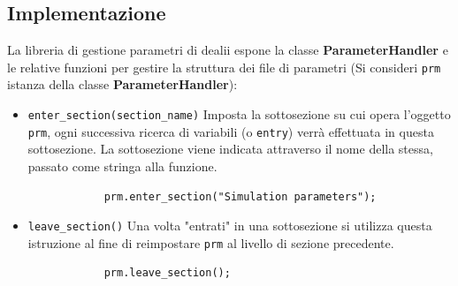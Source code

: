         \subsection{Implementazione}\label{implementazione_prm}
        La libreria di gestione parametri di dealii espone la classe \textbf{ParameterHandler} e
        le relative funzioni per gestire la struttura dei file di parametri (Si consideri \texttt{prm} istanza della classe \textbf{ParameterHandler}):
        \begin{itemize}
            \item \texttt{enter\_section(section\_name)}\newline
            Imposta la sottosezione su cui opera l'oggetto \texttt{prm}, ogni successiva ricerca di variabili (o \texttt{entry}) verrà effettuata
            in questa sottosezione. La sottosezione viene indicata attraverso il nome della stessa, passato come stringa alla funzione.
            \begin{verbatim}
            prm.enter_section("Simulation parameters");
            \end{verbatim}
            \item \texttt{leave\_section()}\newline
            Una volta "entrati" in una sottosezione si utilizza questa istruzione al fine di reimpostare \texttt{prm} al livello di sezione precedente.
            \begin{verbatim}
            prm.leave_section();
            \end{verbatim}


\end{itemize}
